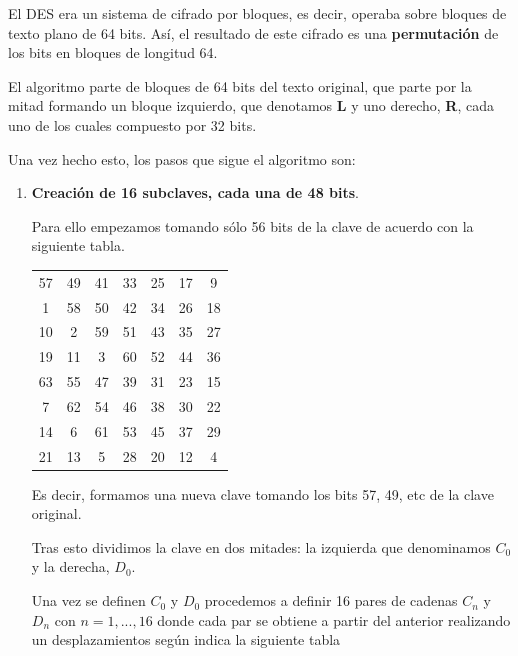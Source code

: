 \documentclass[nochap]{apuntesURJC}
\begin{document}
El DES era un sistema de cifrado por bloques, es decir, operaba sobre bloques de texto plano de 64 bits. Así, el resultado de este cifrado es una \textbf{permutación} de los bits en bloques de longitud 64.

El algoritmo parte de bloques de 64 bits del texto original, que parte por la mitad formando un bloque izquierdo, que denotamos \textbf{L} y uno derecho, \textbf{R}, cada uno de los cuales compuesto por 32 bits.

Una vez hecho esto, los pasos que sigue el algoritmo son:
\begin{enumerate}
\item \textbf{Creación de 16 subclaves, cada una de 48 bits}.

Para ello empezamos tomando sólo 56 bits de la clave de acuerdo con la siguiente tabla.

\begin{center}
\begin{tabular}{ccccccc}
57 &  49 &   41 &  33 &   25  &  17 &   9\\
1  & 58  &  50  & 42  &  34   & 26  & 18\\
10 &   2 &   59 &  51 &   43  &  35 &  27\\
19 &  11 &    3 &  60 &   52  &  44 &  36\\
63 &  55 &   47 &  39 &   31  &  23 &  15\\
7  & 62  &  54  & 46  &  38   & 30  & 22\\
14 &   6 &   61 &  53 &   45  &  37 &  29\\
21 &  13 &    5 &  28 &   20  &  12 &   4
\end{tabular}
\end{center}

Es decir, formamos una nueva clave tomando los bits 57, 49, etc de la clave original.

Tras esto dividimos la clave en dos mitades: la izquierda que denominamos $C_0$ y la derecha, $D_0$.

Una vez se definen $C_0$ y $D_0$ procedemos a definir 16 pares de cadenas $C_n$ y $D_n$ con $n = 1, ..., 16$ donde cada par se obtiene a partir del anterior realizando un desplazamientos según indica la siguiente tabla


\end{enumerate}
\end{document}
